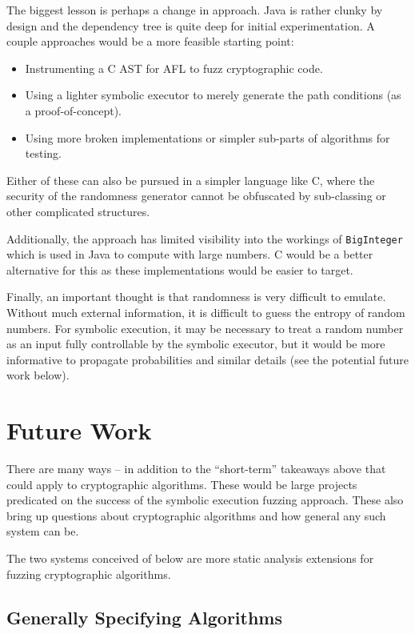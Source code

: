 \documentclass[letterpaper,twocolumn,10pt]{article}
\begin{document}
The biggest lesson is perhaps a change in approach. Java is rather clunky by design and the dependency tree is quite deep
for initial experimentation. A couple approaches would be a more feasible starting point:
\begin{itemize}
    \item Instrumenting a C AST for AFL to fuzz cryptographic code.
    \item Using a lighter symbolic executor to merely generate the path conditions (as a proof-of-concept).
    \item Using more broken implementations or simpler sub-parts of algorithms for testing.
\end{itemize}

Either of these can also be pursued in a simpler language like C, where the security of the randomness generator
cannot be obfuscated by sub-classing or other complicated structures.

Additionally, the approach has limited visibility into the workings of \texttt{BigInteger} which is used in Java
to compute with large numbers. C would be a better alternative for this as these implementations would be easier
to target.

Finally, an important thought is that randomness is very difficult to emulate. Without much external information,
it is difficult to guess the entropy of random numbers. For symbolic execution, it may be necessary to treat
a random number as an input fully controllable by the symbolic executor, but it would be more informative to
propagate probabilities and similar details (see the potential future work below).

\section{Future Work}

There are many ways -- in addition to the ``short-term'' takeaways above that could apply to cryptographic algorithms.
These would be large projects predicated on the success of the symbolic execution fuzzing approach. These also bring up
questions about cryptographic algorithms and how general any such system can be.

The two systems conceived of below are more static analysis extensions for fuzzing cryptographic algorithms.

\subsection{Generally Specifying Algorithms}
\end{document}

